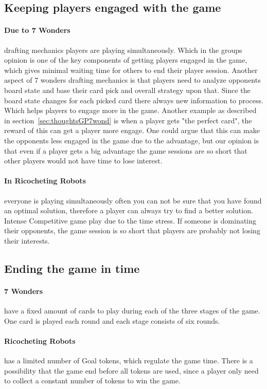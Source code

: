 \documentclass[a4paper]{article}
\begin{document}
\subsection{Keeping players engaged with the game}
\paragraph{Due to 7 Wonders} drafting mechanics players are playing simultaneously. Which in the groups opinion is one of the key components of getting players engaged in the game, which gives minimal waiting time for others to end their player session. Another aspect of 7 wonders drafting mechanics is that players need to analyze opponents board state and base their card pick and overall strategy upon that. Since the board state changes for each picked card there always new information to process. Which helps players to engage more in the game.
Another example as described in section~\ref{sec:thoughtsGP7wond} is when a player gets "the perfect card", the reward of this can get a player more engage. One could argue that this can make the opponents less engaged in the game due to the advantage, but our opinion is that even if a player gets a big advantage the game sessions are so short that other players would not have time to lose interest.  

\paragraph{In Ricocheting Robots} everyone is playing simultaneously often you can not be sure that you have found an optimal solution, therefore a player can always try to find a better solution. Intense Competitive game play due to the time stress. If someone is dominating their opponents, the game session is so short that players are probably not losing their interests.

\subsection{Ending the game in time}
\paragraph{7 Wonders} have a fixed amount of cards to play during each of the three stages of the game. One card is played each round and each stage consists of six rounds.

\paragraph{Ricocheting Robots} has a limited number of Goal tokens, which regulate the game time. There is a possibility that the game end before all tokens are used, since a player only need to collect a constant number of tokens to win the game.
\end{document}
